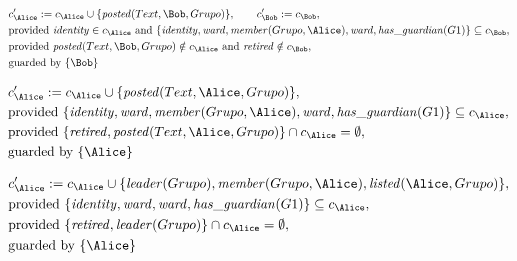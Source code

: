 \begin{align*}
&
c'_
{
\Alice
}
 := 
c_
{
\Alice
}
 \cup 
\{
\mathit{\detokenize{
posted
}}
(
Text
,
\Bob
,
Grupo
)
\}
, \qquad 
c'_
{
\Bob
}
 := 
c_
{
\Bob
}
,\\
&
\text{provided } 
\mathit{\detokenize{
identity
}}
 \in c_
{
\Alice
}
 \text{ and } 
\{
\mathit{\detokenize{
identity
}}
,
\mathit{\detokenize{
ward
}}
,
\mathit{\detokenize{
member
}}
(
Grupo
,
\Alice
)
,
\mathit{\detokenize{
ward
}}
,
\mathit{\detokenize{
has_guardian
}}
(
G1
)
\}
 \subseteq c_
{
\Bob
}
,\\
&
\text{provided } 
\mathit{\detokenize{
posted
}}
(
Text
,
\Bob
,
Grupo
)
 \notin c_
{
\Alice
}
 \text{ and } 
\mathit{\detokenize{
retired
}}
 \notin c_
{
\Bob
}
,\\
&
\text{guarded by } \{
\Bob
\}
\end{align*}

\begin{align*}
&
c'_
{
\Alice
}
 := 
c_
{
\Alice
}
 \cup 
\{
\mathit{\detokenize{
posted
}}
(
Text
,
\Alice
,
Grupo
)
\}
,\\
&
\text{provided } 
\{
\mathit{\detokenize{
identity
}}
,
\mathit{\detokenize{
ward
}}
,
\mathit{\detokenize{
member
}}
(
Grupo
,
\Alice
)
,
\mathit{\detokenize{
ward
}}
,
\mathit{\detokenize{
has_guardian
}}
(
G1
)
\}
 \subseteq c_
{
\Alice
}
,\\
&
\text{provided } 
\{
\mathit{\detokenize{
retired
}}
,
\mathit{\detokenize{
posted
}}
(
Text
,
\Alice
,
Grupo
)
\}
 \cap c_
{
\Alice
}
 = \emptyset
,\\
&
\text{guarded by } \{
\Alice
\}
\end{align*}

\begin{align*}
&
c'_
{
\Alice
}
 := 
c_
{
\Alice
}
 \cup 
\{
\mathit{\detokenize{
leader
}}
(
Grupo
)
,
\mathit{\detokenize{
member
}}
(
Grupo
,
\Alice
)
,
\mathit{\detokenize{
listed
}}
(
\Alice
,
Grupo
)
\}
,\\
&
\text{provided } 
\{
\mathit{\detokenize{
identity
}}
,
\mathit{\detokenize{
ward
}}
,
\mathit{\detokenize{
ward
}}
,
\mathit{\detokenize{
has_guardian
}}
(
G1
)
\}
 \subseteq c_
{
\Alice
}
,\\
&
\text{provided } 
\{
\mathit{\detokenize{
retired
}}
,
\mathit{\detokenize{
leader
}}
(
Grupo
)
\}
 \cap c_
{
\Alice
}
 = \emptyset
,\\
&
\text{guarded by } \{
\Alice
\}
\end{align*}

